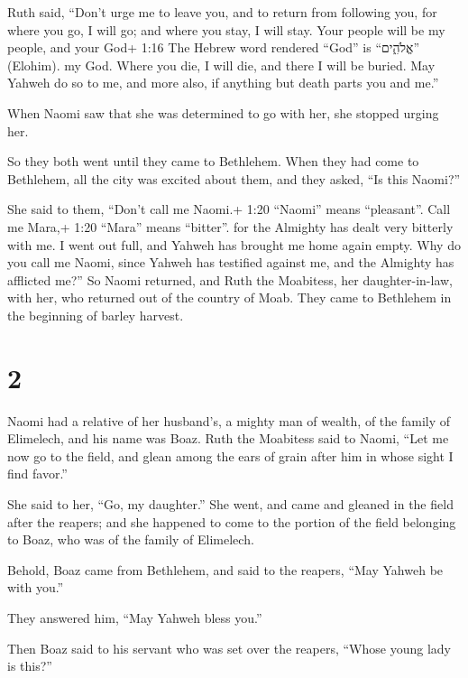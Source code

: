  Ruth said, ``Don't urge me to leave you, and to return
from following you, for where you go, I will go; and where you stay, I
will stay. Your people will be my people, and your God+ 1:16 The Hebrew
word rendered ``God'' is ``אֱלֹהִ֑ים'' (Elohim). my God. 
Where you die, I will die, and there I will be buried. May Yahweh do so
to me, and more also, if anything but death parts you and me.''

 When Naomi saw that she was determined to go with her, she
stopped urging her.

 So they both went until they came to Bethlehem. When they
had come to Bethlehem, all the city was excited about them, and they
asked, ``Is this Naomi?''

 She said to them, ``Don't call me Naomi.+ 1:20 ``Naomi''
means ``pleasant''. Call me Mara,+ 1:20 ``Mara'' means ``bitter''. for
the Almighty has dealt very bitterly with me.  I went out
full, and Yahweh has brought me home again empty. Why do you call me
Naomi, since Yahweh has testified against me, and the Almighty has
afflicted me?''  So Naomi returned, and Ruth the Moabitess,
her daughter-in-law, with her, who returned out of the country of Moab.
They came to Bethlehem in the beginning of barley harvest.

\hypertarget{section-1}{%
\section{2}\label{section-1}}

 Naomi had a relative of her husband's, a mighty man of
wealth, of the family of Elimelech, and his name was Boaz. 
Ruth the Moabitess said to Naomi, ``Let me now go to the field, and
glean among the ears of grain after him in whose sight I find favor.''

She said to her, ``Go, my daughter.''  She went, and came
and gleaned in the field after the reapers; and she happened to come to
the portion of the field belonging to Boaz, who was of the family of
Elimelech.

 Behold, Boaz came from Bethlehem, and said to the reapers,
``May Yahweh be with you.''

They answered him, ``May Yahweh bless you.''

 Then Boaz said to his servant who was set over the reapers,
``Whose young lady is this?''

